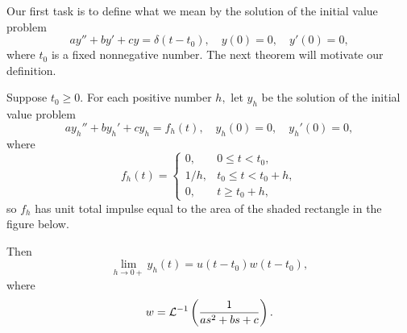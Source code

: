 \documentclass{ximera}
\begin{document}
Our first task is to define what we mean by the solution of
the initial value problem
$$
ay''+by'+cy=\delta(t-t_0), \quad  y(0)=0,\quad y'(0)=0,
$$
where $t_0$ is a fixed nonnegative number. The next theorem will
motivate our definition.

\begin{theorem}\label{thmtype:8.7.1}
Suppose $t_0\geq 0.$ For each positive number $h,$ let $y_h$ be the
solution of the initial value problem
\begin{equation} \label{eq:8.7.1}
ay_h''+by_h'+cy_h=f_h(t), \quad  y_h(0)=0,\quad y_h'(0)=0,
\end{equation}
where
\begin{equation} \label{eq:8.7.2}
f_h(t)=\left\{\begin{array}{cl} 0,&0\leq t<t_0,\\
1/h,&t_0\leq t< t_0+h,\\
0,&t\geq t_0+h,\end{array}\right.
\end{equation}
 so  $f_h$ has unit total impulse
equal to the area of the shaded rectangle in the figure below. 

\begin{center}
\end{center}



Then
\begin{equation} \label{eq:8.7.3}
\lim_{h\rightarrow 0+}y_h(t)=u(t-t_0)w(t-t_0),
\end{equation}
where
$$
w={\cal L}^{-1}\left(\frac{1}{as^2+bs+c}\right).
$$
\end{theorem}
\end{document}
